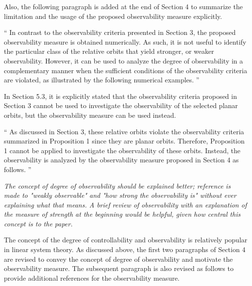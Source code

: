 \documentclass[11pt]{article}
\newenvironment{correction}{\begin{list}{}{\setlength{\leftmargin}{1cm}\setlength{\rightmargin}{1cm}}\vspace{\parsep}\item[]``}{''\end{list}}
\begin{document}
\begin{itemize}
Also, the following paragraph is added at the end of Section 4 to summarize the limitation and the usage of the proposed observability measure explicitly.

\begin{correction}
In contrast to the observability criteria presented in Section 3, the proposed observability measure is obtained numerically. As such, it is not useful to identify the particular class of the relative orbits that yield stronger, or weaker observability. However, it can be used to analyze the degree of observability in a complementary manner when the sufficient conditions of the observability criteria are violated, as illustrated by the following numerical examples.  
\end{correction}


In Section 5.3, it is explicitly stated that the observability criteria proposed in Section 3 cannot be used to investigate the observability of the selected planar orbits, but the observability measure can be used instead.

\begin{correction}
As discussed in Section 3, these relative orbits violate the observability criteria summarized in Proposition 1 since they are planar orbits. Therefore, Proposition 1 cannot be applied to investigate the observability of these orbits. Instead, the observability is analyzed by the observability measure proposed in Section 4 as follows. 
\end{correction}



\item   {\itshape The concept of degree of observability should be explained better; reference is made to "weakly observable" and "how strong the observability is" without ever explaining what that means. A brief review of observability with an explanation of the measure of strength at the beginning would be helpful, given how central this concept is to the paper.}

The concept of the degree of controllability and observability is relatively popular in linear system theory. As discussed above, the first two paragraphs of Section 4 are revised to convey the concept of degree of observability and motivate the observability measure. The subsequent paragraph is also revised as follows to provide additional references for the observability measure.



\end{itemize}
\end{document}
